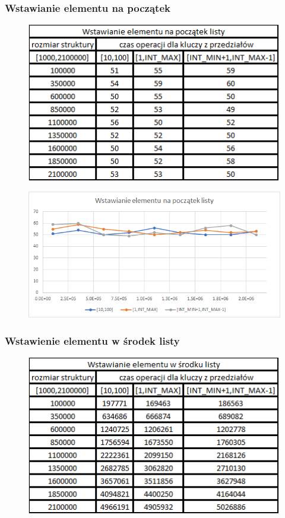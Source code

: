 \documentclass{article}
\begin{document}
\subsubsection*{Wstawianie elementu na początek}
\begin{figure}[h!]

\includegraphics{images/list_dod_pocz.png}

\end{figure}

\begin{figure}[h!]
\includegraphics[width=11.3cm]{images/list_dodaj_poczatek_w.png}
\end{figure}

\newpage

\subsubsection*{Wstawienie elementu w środek listy}

\begin{figure}[h!]

\includegraphics{images/list_wstawianie_srodek_tab.png}

\end{figure}
\end{document}
